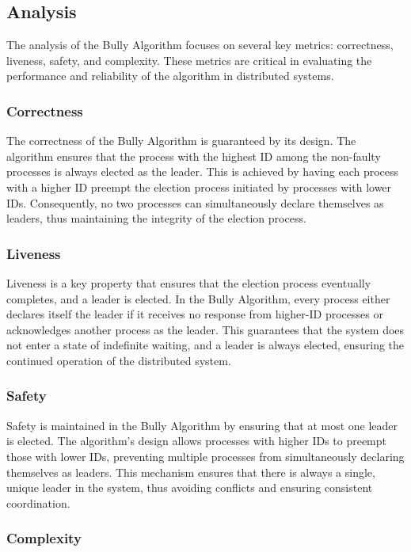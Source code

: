 \subsection{Analysis}
The analysis of the Bully Algorithm focuses on several key metrics: correctness, liveness, safety, and complexity. These metrics are critical in evaluating the performance and reliability of the algorithm in distributed systems.

\subsubsection{Correctness}

The correctness of the Bully Algorithm is guaranteed by its design. The algorithm ensures that the process with the highest ID among the non-faulty processes is always elected as the leader. This is achieved by having each process with a higher ID preempt the election process initiated by processes with lower IDs. Consequently, no two processes can simultaneously declare themselves as leaders, thus maintaining the integrity of the election process.

\subsubsection{Liveness}

Liveness is a key property that ensures that the election process eventually completes, and a leader is elected. In the Bully Algorithm, every process either declares itself the leader if it receives no response from higher-ID processes or acknowledges another process as the leader. This guarantees that the system does not enter a state of indefinite waiting, and a leader is always elected, ensuring the continued operation of the distributed system.

\subsubsection{Safety}

Safety is maintained in the Bully Algorithm by ensuring that at most one leader is elected. The algorithm's design allows processes with higher IDs to preempt those with lower IDs, preventing multiple processes from simultaneously declaring themselves as leaders. This mechanism ensures that there is always a single, unique leader in the system, thus avoiding conflicts and ensuring consistent coordination.

\subsubsection{Complexity}

